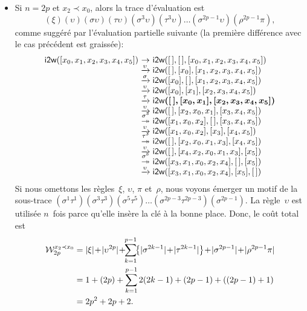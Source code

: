 \begin{itemize}
  \item Si \(n = 2p\) et \(x_2 \prec x_0\), alors la trace
    d'évaluation est
    \begin{equation*}
      (\xi)(\upsilon)(\sigma\upsilon)(\tau\upsilon)
      (\sigma^3\upsilon)(\tau^3\upsilon)
      \ldots (\sigma^{2p-1}\upsilon)(\rho^{2p-1}\pi),
    \end{equation*}
    comme suggéré par l'évaluation partielle suivante (la première
    différence avec le cas précédent est graissée):
\begin{equation*}
\begin{array}{@{}r@{\;}c@{\;}l@{}}
\fun{i2w}([x_{0},x_{1},x_{2},x_{3},x_{4},x_{5}])
& \rightarrow
& \fun{i2w}(\el,\el,[x_{0},x_{1},x_{2},x_{3},x_{4},x_{5}])\\
& \xrightarrow{\smash{\upsilon}}
& \fun{i2w}(\el,[x_{0}],[x_{1},x_{2},x_{3},x_{4},x_{5}])\\
& \xrightarrow{\smash{\sigma}}
& \fun{i2w}([x_{0}],\el,[x_{1},x_{2},x_{3},x_{4},x_{5}])\\
& \xrightarrow{\smash{\upsilon}}
& \fun{i2w}([x_{0}],[x_{1}],[x_{2},x_{3},x_{4},x_{5}])\\
& \xrightarrow{\smash{\tau}}
& \boldsymbol{\fun{i2w}(\el,[x_{0},x_{1}],[x_{2},x_{3},x_{4},x_{5}])}\\
& \xrightarrow{\smash{\upsilon}}
& \fun{i2w}(\el,[x_{2},x_{0},x_{1}],[x_{3},x_{4},x_{5}])\\
& \stackrel{\smash{\sigma^{\smash{3}}}}{\twoheadrightarrow}
& \fun{i2w}([x_{1},x_{0},x_{2}],\el,[x_{3},x_{4},x_{5}])\\
& \xrightarrow{\smash{\upsilon}}
& \fun{i2w}([x_{1},x_{0},x_{2}],[x_{3}],[x_{4},x_{5}])\\
& \stackrel{\smash{\tau^{\smash{3}}}}{\twoheadrightarrow}
& \fun{i2w}(\el,[x_{2},x_{0},x_{1},x_{3}],[x_{4},x_{5}])\\
& \xrightarrow{\smash{\upsilon}}
& \fun{i2w}(\el,[x_{4},x_{2},x_{0},x_{1},x_{3}],[x_{5}])\\
& \stackrel{\smash{\sigma^{\smash{5}}}}{\twoheadrightarrow}
& \fun{i2w}([x_{3},x_{1},x_{0},x_{2},x_{4}],\el,[x_{5}])\\
& \xrightarrow{\smash{\upsilon}}
& \fun{i2w}([x_{3},x_{1},x_{0},x_{2},x_{4}],[x_{5}],\el)
\end{array}
\end{equation*}
Si nous omettons les règles~\(\xi\), \(\upsilon\), \(\pi\)
et~\(\rho\), nous voyons émerger un motif de la sous-trace
\((\sigma^1\tau^1)(\sigma^3\tau^3)(\sigma^5\tau^5) \ldots
(\sigma^{2p-3}\tau^{2p-3})(\sigma^{2p-1})\). La règle~\(\upsilon\) est
utilisée \(n\)~fois parce qu'elle insère la clé à la bonne
place. Donc, le coût total est
\begin{align*}
\W{x_2 \prec x_0}{2p}
   &= \len{\xi} \!+\! \len{\upsilon^{2p}}
    \!+\!\! \sum_{k=1}^{p-1}{\!\!\left\{\len{\sigma^{2k-1}}
    \!+\! \len{\tau^{2k-1}}\right\}}
    \!+\! \len{\sigma^{2p-1}} \!+\! \len{\rho^{2p-1}\pi}\\
   &= 1 + (2p) + \sum_{k=1}^{p-1}{2(2k-1)} + (2p-1) + ((2p - 1) + 1)\\
   &= 2p^2 + 2p + 2.
\end{align*}
\end{itemize}
